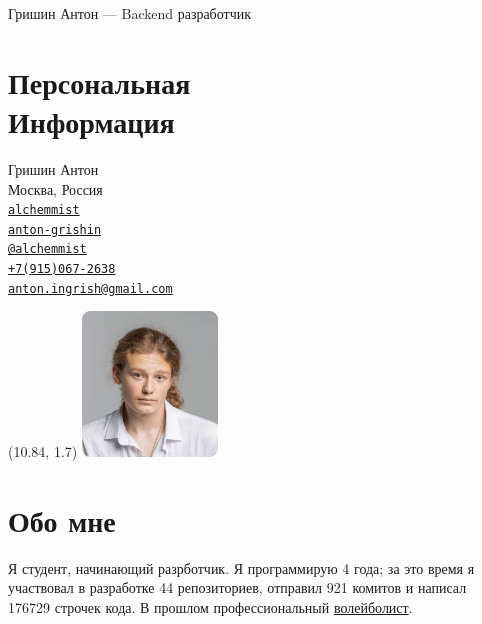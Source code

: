 \documentclass[margin,line]{resume}
\begin{document}
{\sc \large Гришин Антон --- Backend разработчик} \\
\begin{resume}
  \begin{minipage}[t]{0.55\textwidth}
    \section{\mysidestyle Персональная\\Информация}
    Гришин Антон \\
    Москва, Россия \\
    \faGithub  \space
    \href{https://github.com/alchemmist/}{\texttt{alchemmist}} \\
    \faLinkedin \space
    \href{https://www.linkedin.com/in/anton-grishin-6966a8362/}{\texttt{anton-grishin}}
    \\
    \faPaperPlane \space \href{https://t.me/alchemmist}{\texttt{@alchemmist}} \\
    \faPhone \space
    \href{tel:+1234567890}{\color{blue}\texttt{+7(915)067-2638}}  \\
    \faEnvelope \space
    \href{mailto:anton.ingrish@gmail.com}{\color{blue}\texttt{anton.ingrish@gmail.com}}
  \end{minipage}

  \begin{minipage}[H]{0.18\textwidth}
    \begin{textblock}{7}(10.84, 1.7)
      \includegraphics[width=0.27\textwidth]{images/avatar.png}
    \end{textblock}
  \end{minipage}

  \vspace{-5mm}
  \section{\mysidestyle Обо мне}
  Я студент, начинающий разрботчик. Я программирую 4 года; за
  это время я участвовал в разработке 44 репозиториев, отправил 921
  комитов и написал
  176729 строчек кода. В прошлом профессиональный
  \href{https://github.com/alchemmist/CV/blob/main/attachments/sport.pdf}{волейболист}.


\end{resume}
\end{document}
